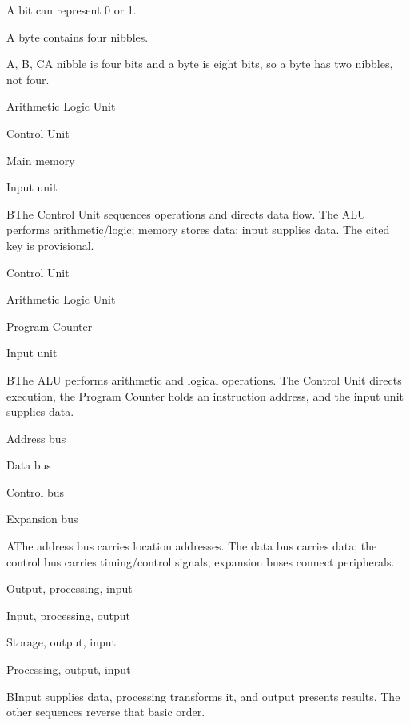 \begin{enumerate}[label=\textbf{Q\arabic*.}, leftmargin=*]
{   \item A bit can represent 0 or 1.
   \item A byte contains four nibbles.}
  {A, B, C}{A nibble is four bits and a byte is eight bits, so a byte has two nibbles, not four.}
\fi
\ifnum{}
  {\item Arithmetic Logic Unit
   \item Control Unit
   \item Main memory
   \item Input unit}
  {B}{The Control Unit sequences operations and directs data flow. The ALU performs arithmetic/logic; memory stores data; input supplies data. The cited key is provisional.}
  {\item Control Unit
   \item Arithmetic Logic Unit
   \item Program Counter
   \item Input unit}
  {B}{The ALU performs arithmetic and logical operations. The Control Unit directs execution, the Program Counter holds an instruction address, and the input unit supplies data.}
  {\item Address bus
   \item Data bus
   \item Control bus
   \item Expansion bus}
  {A}{The address bus carries location addresses. The data bus carries data; the control bus carries timing/control signals; expansion buses connect peripherals.}
  {\item Output, processing, input
   \item Input, processing, output
   \item Storage, output, input
   \item Processing, output, input}
  {B}{Input supplies data, processing transforms it, and output presents results. The other sequences reverse that basic order.}

\end{enumerate}
